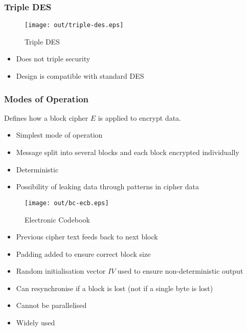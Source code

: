 \documentclass[a4paper]{article}
\begin{document}
\subsubsection{Triple DES}

\begin{figure}[h!]
  \centering
  \texttt{[image: out/triple-des.eps]}
  \caption{Triple DES}
  \label{fig:triple-des}
\end{figure}
\FloatBarrier

\begin{itemize}
  \item Does not triple security
  \item Design is compatible with standard DES
\end{itemize}

\subsubsection{Modes of Operation}

Defines how a block cipher $E$ is applied to encrypt data.


\begin{itemize}
  \item Simplest mode of operation
  \item Message split into several blocks and each block encrypted individually
  \item Deterministic
  \item Possibility of leaking data through patterns in cipher data
\end{itemize}

\begin{figure}[h!]
  \centering
  \texttt{[image: out/bc-ecb.eps]}
  \caption{Electronic Codebook}
  \label{fig:bc-ecb}
\end{figure}
\FloatBarrier


\begin{itemize}
  \item Previous cipher text feeds back to next block
  \item Padding added to ensure correct block size
  \item Random initialisation vector $IV$ used to ensure non-deterministic
        output
  \item Can resynchronise if a block is lost (not if a single byte is lost)
  \item Cannot be parallelised
  \item Widely used
\end{itemize}
\end{document}
